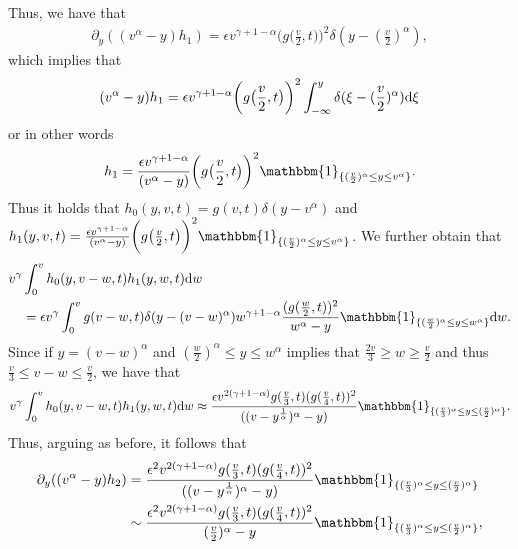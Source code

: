 \documentclass[11pt]{article}
\numberwithin{equation}{section}
\newcommand{\der}{\textup{d}}
\begin{document}
Thus, we have that
\begin{align*}
    \partial_{y}((v^{\alpha}-y)h_{1})
    =\epsilon v^{\gamma+1-\alpha} \bigg(g\big(\frac{v}{2},t\big)\bigg)^{2}\delta(y-(\frac{v}{2})^{\alpha}),
\end{align*}
which implies that
\begin{align*}
(v^{\alpha}-y)h_{1}
    = \epsilon v^{\gamma+1-\alpha} \bigg(g\big(\frac{v}{2},t\big)\bigg)^{2}\int_{-\infty}^{y}\delta(\xi-(\frac{v}{2})^{\alpha})\der \xi
\end{align*}
or in other words
\begin{align*}
h_{1}
    =\frac{\epsilon v^{\gamma+1-\alpha} }{(v^{\alpha}-y)}\bigg(g\big(\frac{v}{2},t\big)\bigg)^{2}\mathbbm{1}_{\{(\frac{v}{2})^{\alpha}\leq y\leq v^{\alpha}\}}.
\end{align*}
Thus it holds that   $h_{0}(y,v,t)=g(v,t)\delta(y-v^{\alpha})$ and $h_{1}(y,v,t)= \frac{\epsilon v^{\gamma+1-\alpha} }{(v^{\alpha}-y)}\bigg(g\big(\frac{v}{2},t\big)\bigg)^{2}\mathbbm{1}_{\{(\frac{v}{2})^{\alpha}\leq y\leq v^{\alpha}\}}$. We further obtain that
\begin{align*}
   v^{\gamma} & \int_{0}^{v}h_{0}(y,v-w,t)h_{1}(y,w,t)\der w\\
   &= \epsilon v^{\gamma}\int_{0}^{v}g(v-w,t)\delta(y-(v-w)^{\alpha}) w^{\gamma+1-\alpha}\frac{(g(\frac{w}{2},t))^{2}}{w^{\alpha}-y}\mathbbm{1}_{\{(\frac{w}{2})^{\alpha}\leq y\leq w^{\alpha}\}}\der w.
\end{align*}
Since if $y=(v-w)^{\alpha}$ and $(\frac{w}{2})^{\alpha}\leq y\leq w^{\alpha}$ implies that $\frac{2v}{3}\geq w\geq \frac{v}{2}$ and thus $\frac{v}{3}\leq v-w\leq \frac{v}{2}$, we have that
\begin{align*}
   v^{\gamma} \int_{0}^{v}h_{0}(y,v-w,t)h_{1}(y,w,t)\der w\approx  \frac{\epsilon v^{2(\gamma+1-\alpha)} g(\frac{v}{3},t)(g(\frac{v}{4},t))^{2}}{((v-y^{\frac{1}{\alpha}})^{\alpha}-y)}\mathbbm{1}_{\{(\frac{v}{3})^{\alpha}\leq y\leq (\frac{v}{2})^{\alpha}\}}.
\end{align*}
Thus, arguing as before, it follows that
\begin{align*}
    \partial_{y}((v^{\alpha}-y)h_{2})&=  \frac{\epsilon^{2} v^{2(\gamma+1-\alpha)} g(\frac{v}{3},t)(g(\frac{v}{4},t))^{2}}{((v-y^{\frac{1}{\alpha}})^{\alpha}-y)}\mathbbm{1}_{\{(\frac{v}{3})^{\alpha}\leq y\leq (\frac{v}{2})^{\alpha}\}}\\
    &\sim \frac{\epsilon^{2} v^{2(\gamma+1-\alpha)} g(\frac{v}{3},t)(g(\frac{v}{4},t))^{2}}{(\frac{v}{2})^{\alpha}-y}\mathbbm{1}_{\{(\frac{v}{3})^{\alpha}\leq y\leq (\frac{v}{2})^{\alpha}\}},
\end{align*}
\end{document}
